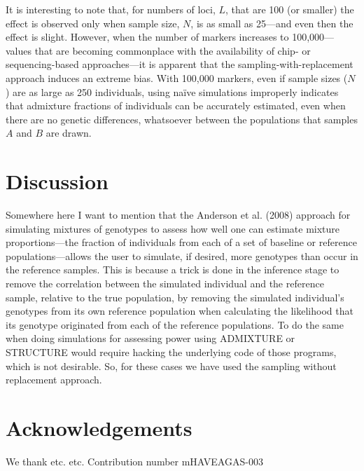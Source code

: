 It is interesting to note
that, for numbers of loci,  $L$, that are 100 (or smaller) the effect is observed only when
sample size, $N$, is as small as 25---and even then the effect is slight.  However, when the
number of markers increases to 100,000---values that are becoming commonplace with the availability of chip-
or sequencing-based approaches---it is apparent that the sampling-with-replacement approach
induces an extreme bias.  With 100,000 markers, even if sample sizes ($N$) are as large as 250 individuals,
using na\"{i}ve simulations improperly indicates that admixture fractions of individuals can be
accurately estimated, even when there are no genetic differences, whatsoever between the populations that
samples $A$ and $B$ are drawn.



\section*{Discussion}

Somewhere here I want to mention that the Anderson et al. (2008) approach for simulating
mixtures of genotypes to assess how well one can estimate mixture proportions---the fraction
of individuals from each of a set of baseline or reference populations---allows the user to
simulate, if desired, more genotypes than occur in the reference samples.  This is because
a trick is done in the inference stage to remove the correlation between the simulated individual
and the reference sample, relative to the true population, by removing the simulated individual's
genotypes from its own reference population when calculating the likelihood that its genotype
originated from each of the reference populations.  To do the same when doing simulations for
assessing power using ADMIXTURE or STRUCTURE would require hacking the underlying code
of those programs, which is not desirable.  So, for these cases we have used the sampling
without replacement approach.



\section*{Acknowledgements}
We thank etc. etc.   Contribution number  mHAVEAGAS-003
